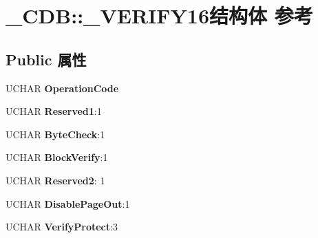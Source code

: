 \hypertarget{struct___c_d_b_1_1___v_e_r_i_f_y16}{}\section{\+\_\+\+C\+DB\+:\+:\+\_\+\+V\+E\+R\+I\+F\+Y16结构体 参考}
\label{struct___c_d_b_1_1___v_e_r_i_f_y16}
\subsection*{Public 属性}
\begin{DoxyCompactItemize}
\item 
\mbox{\label{struct___c_d_b_1_1___v_e_r_i_f_y16_af93ee7f17acc3cdb9d7cb9cae75c0a8f}} 
U\+C\+H\+AR {\bfseries Operation\+Code}
\item 
\mbox{\label{struct___c_d_b_1_1___v_e_r_i_f_y16_aa7957c22a22b9484054aeeb975f0569b}} 
U\+C\+H\+AR {\bfseries Reserved1}\+:1
\item 
\mbox{\label{struct___c_d_b_1_1___v_e_r_i_f_y16_ab24b78c5518cadacb8cd78cdbb87b9d5}} 
U\+C\+H\+AR {\bfseries Byte\+Check}\+:1
\item 
\mbox{\label{struct___c_d_b_1_1___v_e_r_i_f_y16_a404544c73996675a697a069cf984ffa5}} 
U\+C\+H\+AR {\bfseries Block\+Verify}\+:1
\item 
\mbox{\label{struct___c_d_b_1_1___v_e_r_i_f_y16_afa1e1581a93eae1eaa9bbe7d788429e0}} 
U\+C\+H\+AR {\bfseries Reserved2}\+: 1
\item 
\mbox{\label{struct___c_d_b_1_1___v_e_r_i_f_y16_a732b1e9e2b2bf37ffbbbdc87d45f4048}} 
U\+C\+H\+AR {\bfseries Disable\+Page\+Out}\+:1
\item 
\mbox{\label{struct___c_d_b_1_1___v_e_r_i_f_y16_ae7c79d82c20498e61a7738c5fa39f4b7}} 
U\+C\+H\+AR {\bfseries Verify\+Protect}\+:3
\item 
\mbox{\label{struct___c_d_b_1_1___v_e_r_i_f_y16_a8e65da337c307f0e3dd2718377d6431f}} 

\end{DoxyCompactItemize}
